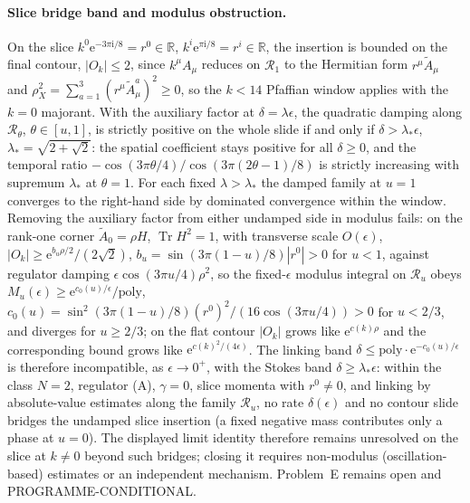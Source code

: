 \paragraph{Slice bridge band and modulus obstruction.} On the slice \(k^0\mathrm e^{-3\pi\mathrm i/8}=r^0\in\mathbb R\), \(k^i\mathrm e^{\pi\mathrm i/8}=r^i\in\mathbb R\), the insertion is bounded on the final contour, \(|O_k|\le2\), since \(k^\mu A_\mu\) reduces on \(\mathcal R_1\) to the Hermitian form \(r^\mu\tilde A_\mu\) and \(\rho_X^2=\sum_{a=1}^{3}(r^\mu\tilde A^a_\mu)^2\ge0\), so the \(k<14\) Pfaffian window applies with the \(k=0\) majorant. With the auxiliary factor at \(\delta=\lambda\epsilon\), the quadratic damping along \(\mathcal R_\theta\), \(\theta\in[u,1]\), is strictly positive on the whole slide if and only if \(\delta>\lambda_*\epsilon\), \(\lambda_*=\sqrt{2+\sqrt2}\): the spatial coefficient stays positive for all \(\delta\ge0\), and the temporal ratio \(-\cos(3\pi\theta/4)/\cos(3\pi(2\theta-1)/8)\) is strictly increasing with supremum \(\lambda_*\) at \(\theta=1\). For each fixed \(\lambda>\lambda_*\) the damped family at \(u=1\) converges to the right-hand side by dominated convergence within the window. Removing the auxiliary factor from either undamped side in modulus fails: on the rank-one corner \(\tilde A_0=\rho H\), \(\operatorname{Tr}H^2=1\), with transverse scale \(O(\epsilon)\), \(|O_k|\ge\mathrm e^{b_u\rho/2}/(2\sqrt2)\), \(b_u=\sin(3\pi(1-u)/8)|r^0|>0\) for \(u<1\), against regulator damping \(\epsilon\cos(3\pi u/4)\rho^2\), so the fixed-\(\epsilon\) modulus integral on \(\mathcal R_u\) obeys \(M_u(\epsilon)\ge\mathrm e^{c_0(u)/\epsilon}/\mathrm{poly}\), \(c_0(u)=\sin^2(3\pi(1-u)/8){(r^0)}^2/(16\cos(3\pi u/4))>0\) for \(u<2/3\), and diverges for \(u\ge2/3\); on the flat contour \(|O_k|\) grows like \(\mathrm e^{c(k)\rho}\) and the corresponding bound grows like \(\mathrm e^{c(k)^2/(4\epsilon)}\). The linking band \(\delta\le\mathrm{poly}\cdot\mathrm e^{-c_0(u)/\epsilon}\) is therefore incompatible, as \(\epsilon\to0^+\), with the Stokes band \(\delta\ge\lambda_*\epsilon\): within the class \(N=2\), regulator (A), \(\gamma=0\), slice momenta with \(r^0\ne0\), and linking by absolute-value estimates along the family \(\mathcal R_u\), no rate \(\delta(\epsilon)\) and no contour slide bridges the undamped slice insertion (a fixed negative mass contributes only a phase at \(u=0\)). The displayed limit identity therefore remains unresolved on the slice at \(k\ne0\) beyond such bridges; closing it requires non-modulus (oscillation-based) estimates or an independent mechanism. Problem~E remains open and PROGRAMME-CONDITIONAL.


